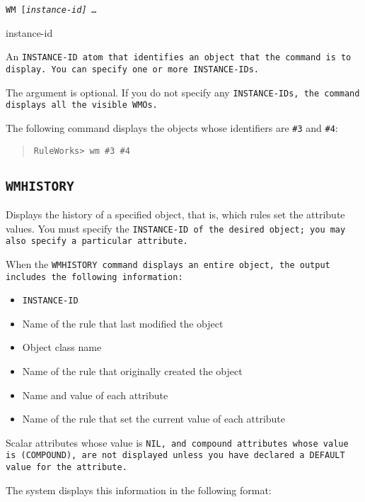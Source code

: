 {{\Format

\tt{WM} [\it{instance-id}] \ldots

\begin{arguments}
\item[instance-id]

  An \tt{INSTANCE-ID} atom that identifies an object that the command
  is to display. You can specify one or more \tt{INSTANCE-ID}s.

  The argument is optional. If you do not specify any \tt{INSTANCE-ID}s,
  the command displays all the visible WMOs.
\end{arguments}

\Example

The following command displays the objects whose identifiers are
\verb|#3| and \verb|#4|:

\begin{quote}
\begin{verbatim}
RuleWorks> wm #3 #4
\end{verbatim}
\end{quote}

\subsection{\tt{WMHISTORY}}

Displays the history of a specified object, that is, which rules set
the attribute values. You must specify the \tt{INSTANCE-ID} of the desired
object; you may also specify a particular attribute.

When the \tt{WMHISTORY} command displays an entire object, the
output includes the following information:
\begin{itemize}
\item \tt{INSTANCE-ID}
\item Name of the rule that last modified the object
\item Object class name
\item Name of the rule that originally created the object
\item Name and value of each attribute
\item Name of the rule that set the current value of each attribute
\end{itemize}

Scalar attributes whose value is \tt{NIL}, and compound attributes whose
value is \tt{(COMPOUND)}, are not displayed unless you have declared a
\tt{DEFAULT} value for the attribute.

The system displays this information in the following format:

}}
